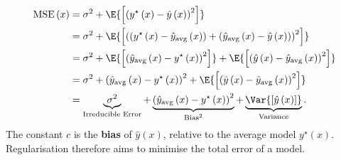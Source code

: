 \documentclass{article}
\begin{document}
\begin{align*}
    \mathrm{MSE}\left( x \right) & = \sigma^2 + \E{\left[ {\left( y^\star\left( x \right) - \hat{y}\left( x \right) \right)}^2 \right]}                                                                                                                                                     \\
                                 & = \sigma^2 + \E{\left[ {\left( \left( y^\star\left( x \right) - \hat{y}_{\mathrm{avg}}\left( x \right) \right) + \left( \hat{y}_{\mathrm{avg}}\left( x \right) - \hat{y}\left( x \right) \right) \right)}^2 \right]}                                     \\
                                 & = \sigma^2 + \E{\left[ {\left( \hat{y}_{\mathrm{avg}}\left( x \right) - y^\star\left( x \right) \right)}^2 \right]} + \E{\left[ {\left( \hat{y}\left( x \right) - \hat{y}_{\mathrm{avg}}\left( x \right) \right)}^2 \right]}                             \\
                                 & = \sigma^2 + {\left( \hat{y}_{\mathrm{avg}}\left( x \right) - y^\star\left( x \right) \right)}^2 + \E{\left[ {\left( \hat{y}\left( x \right) - \hat{y}_{\mathrm{avg}}\left( x \right) \right)}^2 \right]}                                                \\
                                 & = \underbrace{\sigma^2}_{\text{Irreducible Error}} + \underbrace{{\left( \hat{y}_{\mathrm{avg}}\left( x \right) - y^\star\left( x \right) \right)}^2}_{\mathrm{Bias}^2} + \underbrace{\Var{\left[ \hat{y}\left( x \right) \right]}}_{\mathrm{Variance}}.
\end{align*}
The constant \(c\) is the \textbf{bias} of \(\hat{y}\left( x \right)\),
relative to the average model \(y^\star\left( x \right)\). Regularisation
therefore aims to minimise the total error of a model.
\end{document}
